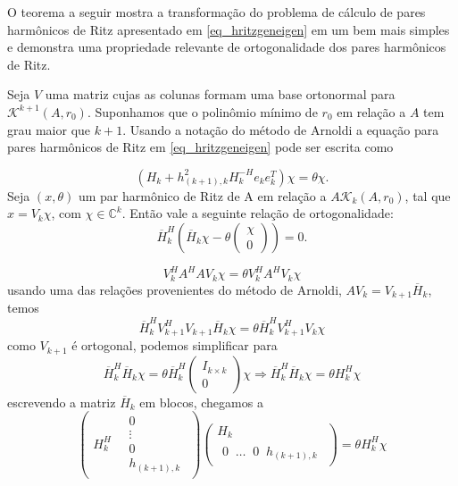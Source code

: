 O teorema a seguir mostra a transformação do problema de cálculo de pares harmônicos de Ritz apresentado em \eqref{eq_hritzgeneigen} em um  bem mais simples  e demonstra uma propriedade relevante de ortogonalidade dos pares harmônicos de Ritz.

\begin{teore}\label{teo_alglin_arnoldiritz}
Seja $V$ uma matriz cujas as colunas formam uma base ortonormal para $\mathcal{K}^{k+1}(A, r_0)$. Suponhamos que o polinômio mínimo de $r_0$   em relação a $A$ tem grau maior que $k+1$.  Usando a notação do método de Arnoldi a equação para pares harmônicos de Ritz em \eqref{eq_hritzgeneigen} pode ser escrita como

\begin{equation}\label{eq_teo_alglin_arnoldiritzcalcul}
(H_k+h_{(k+1),k}^2 H_k^{-H} e_k e_k^T)\chi =  \theta\chi.
\end{equation}
Seja $(x,\theta)$ um par harmônico de Ritz de A em relação a $A\mathcal{K}_k(A,r_0)$, tal que $x=V_k\chi$, com $\chi\in\mathbb{C}^k$. Então vale a seguinte relação de ortogonalidade:
\begin{equation}\label{eq_teo_alglin_arnoldiritzortho}
\overline{H}_k^H (\overline{H}_k \chi-  \theta\begin{pmatrix} \chi\\0 \end{pmatrix})=0.
\end{equation}

\end{teore}
\dem
\[
   V_k^HA^HAV_k\chi=\theta V_k^HA^HV_k\chi
\]
usando uma das relaç\~{o}es provenientes do método de Arnoldi, $AV_k=V_{k+1}\overline{H}_k$, temos
\[
   \overline{H}_k^H V_{k+1}^HV_{k+1}\overline{H}_k \chi = \theta\overline{H}_k^H V_{k+1}^HV_k\chi
\]
como $V_{k+1}$ é ortogonal, podemos simplificar para
\begin{equation}\label{eq_teo_alglin_arnoldiritzhbarh}
   \overline{H}_k^H\overline{H}_k\chi =\theta\overline{H}_k^H \begin{pmatrix}I_{k\times k}\\ 0\end{pmatrix}\chi
    \Rightarrow
\overline{H}_k^H\overline{H}_k\chi = \theta H_k^H\chi
\end{equation}
escrevendo a matriz $\overline{H}_k$ em blocos, chegamos a
\[
\begin{pmatrix}H_k^H \quad \begin{matrix}0\\\vdots\\0\\h_{(k+1),k} \end{matrix}\end{pmatrix}
 \begin{pmatrix}H_k\\ \begin{matrix}0\;\;\ldots\;\;0\;\;h_{(k+1),k} \end{matrix}\end{pmatrix} =\theta H_k^H\chi
 \]

